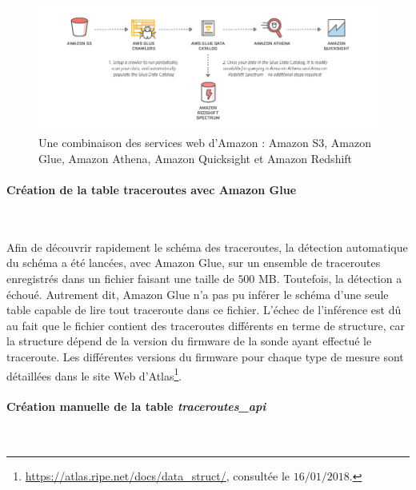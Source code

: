\begin{figure}[h]
	\centering
	\captionsetup{justification=centering}
	\includegraphics[width=1\linewidth]{illustrations/glue_crawler}
	\caption{Une combinaison des services web d'Amazon : Amazon S3, Amazon Glue, Amazon Athena, Amazon Quicksight  et Amazon Redshift}
	\label{fig:gluecrawler}
\end{figure}


\paragraph{Création de la table traceroutes avec Amazon Glue}~

Afin de découvrir rapidement le schéma des traceroutes,     la détection automatique du schéma a été lancées, avec Amazon Glue, sur un ensemble de  traceroutes enregistrés dans un fichier faisant une taille de $500$ MB. Toutefois, la détection a échoué. Autrement dit, Amazon Glue n'a pas pu inférer le schéma d'une seule table capable de lire tout traceroute dans ce fichier.  L'échec de l'inférence est dû au fait que le fichier contient des traceroutes différents en terme de structure, car la structure dépend de la version du firmware de la sonde ayant effectué le traceroute. Les différentes versions du firmware  pour chaque type de mesure sont détaillées dans le site Web d'Atlas\footnote{\url{https://atlas.ripe.net/docs/data_struct/}, consultée le $16/01/2018$.}.

\paragraph{Création manuelle de la table \textit{traceroutes\_api}}~ \label{creer-table-traceroute}


